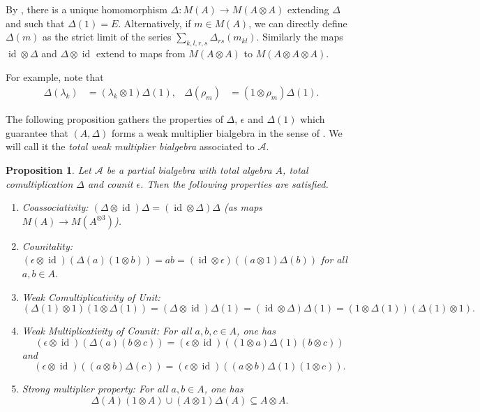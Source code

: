 \documentclass[10pt]{article}
\DeclareMathOperator{\id}{id}
\newtheorem{Prop}[Theorem]{Proposition}
\theoremstyle{definition}
\numberwithin{equation}{section}
\begin{document}
By \cite[Proposition A.3]{VDW2}, there is a unique homomorphism $\Delta:M(A)\rightarrow M(A\otimes A)$ extending $\Delta$ and such that $\Delta(1) = E$. Alternatively, if $m\in M(A)$, we can directly define $\Delta(m)$ as the strict limit of the series $\sum_{k,l,r,s} \Delta_{rs}(m_{kl})$. Similarly the maps $\id\otimes \Delta$ and $\Delta\otimes \id$ extend to maps from $M(A\otimes A)$ to $M(A\otimes A\otimes A)$. 

For example, note that
\begin{align} \label{eq:delta-lambda-rho} \Delta(\lambda_{k}) &=
  (\lambda_{k} \otimes 1)\Delta(1), & \Delta(\rho_{m}) &= (1 \otimes \rho_{m})\Delta(1).
\end{align}

The following proposition gathers the properties of $\Delta$, $\epsilon$ and $\Delta(1)$ which guarantee that $(A,\Delta)$ forms a weak multiplier bialgebra in the sense of \cite[Definition 2.1]{Boh1}. We will call it the \emph{total weak multiplier bialgebra} associated to $\mathscr{A}$.

\begin{Prop} Let $\mathscr{A}$ be a partial bialgebra with total algebra $A$, total comultiplication $\Delta$ and counit $\epsilon$. Then the following properties are satisfied.
\begin{enumerate}[label={(\arabic*)}]
\item Coassociativity: $(\Delta\otimes \id)\Delta = (\id\otimes \Delta)\Delta$ (as maps $M(A)\rightarrow M(A^{\otimes 3})$).
\item Counitality: $(\epsilon\otimes \id)(\Delta(a)(1\otimes b)) = ab = (\id\otimes \epsilon)((a\otimes 1)\Delta(b))$ for all $a,b\in A$.
\item Weak Comultiplicativity of Unit: \[(\Delta(1)\otimes 1)(1\otimes \Delta(1)) = (\Delta\otimes \id)\Delta(1) = (\id\otimes \Delta)\Delta(1) = (1\otimes \Delta(1))(\Delta(1)\otimes 1).\]
\item \label{WMC} Weak Multiplicativity of Counit: For all $a,b,c\in A$, one has \[(\epsilon\otimes \id)(\Delta(a)(b\otimes c)) = (\epsilon\otimes \id)((1\otimes a)\Delta(1)(b\otimes c))\] and 
\[(\epsilon\otimes \id)((a\otimes b)\Delta(c)) = (\epsilon\otimes \id)((a\otimes b)\Delta(1)(1\otimes c)).\]
\item Strong multiplier property: For all $a,b\in A$, one has \[\Delta(A)(1\otimes A)\cup (A\otimes 1)\Delta(A)\subseteq  A\otimes A.\] 
\end{enumerate}
\end{Prop}
\end{document}
